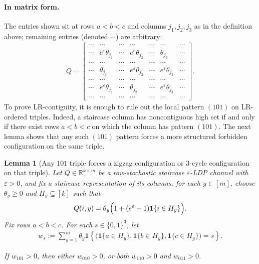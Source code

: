 \documentclass{article}
\theoremstyle{plain}
\newtheorem{lemma}[theorem]{Lemma}
\theoremstyle{definition}
\theoremstyle{plain}
\begin{document}
\paragraph{In matrix form.}
The entries shown sit at rows $a<b<c$ and columns $j_1,j_2,j_3$ as in the definition above; remaining entries (denoted $\cdots$) are arbitrary:
\begin{align*}
    Q=
    \begin{bmatrix}
    \cdots & \cdots & \cdots & \cdots & \cdots & \cdots & \cdots \\
    \cdots & e^\varepsilon \theta_{j_1} & \cdots & e^\varepsilon \theta_{j_2} & \cdots & \theta_{j_3} & \cdots \\
    \cdots & \cdots & \cdots & \cdots & \cdots & \cdots & \cdots \\
    \cdots & \theta_{j_1} & \cdots & e^\varepsilon \theta_{j_2} & \cdots & e^\varepsilon \theta_{j_3} & \cdots \\
    \cdots & \cdots & \cdots & \cdots & \cdots & \cdots & \cdots \\
    \cdots & e^\varepsilon \theta_{j_1} & \cdots & \theta_{j_2} & \cdots & e^\varepsilon \theta_{j_3} & \cdots \\
    \cdots & \cdots & \cdots & \cdots & \cdots & \cdots & \cdots
    \end{bmatrix}.
\end{align*}
To prove LR-contiguity, it is enough to rule out the local pattern $(101)$ on LR-ordered triples. Indeed, a staircase column has noncontiguous high set if and only if there exist rows $a<b<c$ on which the column has pattern $(101)$. The next lemma shows that any such $(101)$ pattern forces a more structured forbidden configuration on the same triple.
\begin{lemma}[Any $101$ triple forces a zigzag configuration or $3$-cycle configuration on that triple]
\label{lemma:any-101-triple-forces-zigzag-or-3-cycle}
Let $Q \in \mathbb{R}_+^{k\times m}$ be a row-stochastic staircase $\varepsilon$-LDP channel with $\varepsilon>0$, and fix a staircase representation of its columns: for each $y\in[m]$, choose $\theta_y \ge 0$ and $H_y\subseteq[k]$ such that
\begin{align*}
    Q(i,y)=\theta_y\Bigl(1+(e^\varepsilon-1)\mathbf{1}\{i\in H_y\}\Bigr).
\end{align*}
Fix rows $a < b < c$. For each $s \in \{0,1\}^3$, let
\begin{align*}
    w_s := \sum_{y=1}^{m} \theta_y
    \mathbf{1}\left\{
    \bigl(\mathbf{1}\{a\in H_y\},\mathbf{1}\{b\in H_y\},\mathbf{1}\{c\in H_y\}\bigr)=s
    \right\}.
\end{align*}

If $w_{101} > 0$, then either $w_{010} > 0$, or both $w_{110} > 0$ and $w_{011} > 0$.
\end{lemma}
\end{document}
